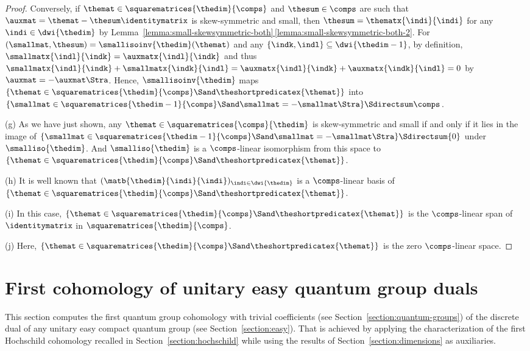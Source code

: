 \documentclass[pdftex]{sigma}
\numberwithin{equation}{section}
\begin{document}
{\begin{proof}
   Conversely, if $\themat\in\squarematrices{\thedim}{\comps}$ and $\thesum\in\comps$ are such that  $\auxmat=\themat-\thesum\identitymatrix$ is skew-symmetric and small, then   $\thesum=\thematx{\indi}{\indi}$ for any $\indi\in\dwi{\thedim}$ by Lem\-ma~\hyperref[lemma:small-skewsymmetric-both-2]{\ref*{lemma:small-skewsymmetric-both}\,\ref*{lemma:small-skewsymmetric-both-2}}. For $(\smallmat,\thesum)=\smallisoinv{\thedim}(\themat)$  and any $\{\indk,\indl\}\subseteq \dwi{\thedim-1}$, by definition, $\smallmatx{\indl}{\indk}=\auxmatx{\indl}{\indk}$ and thus  $\smallmatx{\indl}{\indk}+\smallmatx{\indk}{\indl}=\auxmatx{\indl}{\indk}+\auxmatx{\indk}{\indl}=0$ by $\auxmat=-\auxmat\Stra$. Hence,  $\smallisoinv{\thedim}$ maps $\{\themat\in\squarematrices{\thedim}{\comps}\Sand \theshortpredicatex{\themat}\}$ into $\{\smallmat\in\squarematrices{\thedim-1}{\comps}\Sand \smallmat=-\smallmat\Stra\}\Sdirectsum\comps$.

   (g)
   As we have just shown, any $\themat\in\squarematrices{\comps}{\thedim}$ is skew-symmetric and small if and only if it lies in the image of $\{\smallmat\in\squarematrices{\thedim-1}{\comps}\Sand \smallmat=-\smallmat\Stra\}\Sdirectsum\{0\}$ under $\smalliso{\thedim}$. And  $\smalliso{\thedim}$ is a $\comps$-linear isomorphism from this space to  $\{\themat\in\squarematrices{\thedim}{\comps}\Sand \theshortpredicatex{\themat}\}$.

   (h)
   It is well known that $(\matb{\thedim}{\indi}{\indi})_{\indi\in\dwi{\thedim}}$ is a $\comps$-linear basis of $\{\themat\in\squarematrices{\thedim}{\comps}\Sand \theshortpredicatex{\themat}\}$.

   (i)
   In this case, $\{\themat\in\squarematrices{\thedim}{\comps}\Sand \theshortpredicatex{\themat}\}$ is the $\comps$-linear span of $\identitymatrix$ in $\squarematrices{\thedim}{\comps}$.

   (j)
   Here,  $\{\themat\in\squarematrices{\thedim}{\comps}\Sand \theshortpredicatex{\themat}\}$ is the zero  $\comps$-linear space.
  \end{proof}
  }


\section{First cohomology of unitary easy quantum group duals}
\label{section:main-one}
This section computes the first quantum group  cohomology with trivial coefficients (see Section~\ref{section:quantum-groups}) of the discrete dual of any unitary easy compact quantum group (see Section~\ref{section:easy}). That is achieved by applying the characterization of the first Hochschild cohomology recalled in Section~\ref{section:hochschild} while using the results of Section~\ref{section:dimensions} as auxiliaries.
\end{document}
